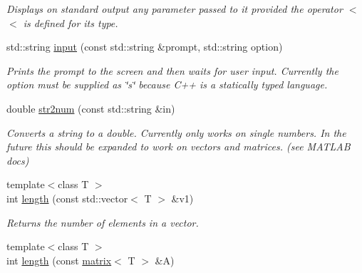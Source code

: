\begin{DoxyCompactItemize}
\begin{DoxyCompactList}\small\item\em Displays on standard output any parameter passed to it provided the operator $<$$<$ is defined for its type. \end{DoxyCompactList}\item 
\hypertarget{namespacekeycpp_aba69db64fe38ad271de1939d3f1a5520}{std\-::string \hyperlink{namespacekeycpp_aba69db64fe38ad271de1939d3f1a5520}{input} (const std\-::string \&prompt, std\-::string option)}\label{namespacekeycpp_aba69db64fe38ad271de1939d3f1a5520}

\begin{DoxyCompactList}\small\item\em Prints the prompt to the screen and then waits for user input. Currently the option must be supplied as \char`\"{}s\char`\"{} because C++ is a statically typed language. \end{DoxyCompactList}\item 
\hypertarget{namespacekeycpp_a4bca7924aad17a920f2f5f0606e6d9a9}{double \hyperlink{namespacekeycpp_a4bca7924aad17a920f2f5f0606e6d9a9}{str2num} (const std\-::string \&in)}\label{namespacekeycpp_a4bca7924aad17a920f2f5f0606e6d9a9}

\begin{DoxyCompactList}\small\item\em Converts a string to a double. Currently only works on single numbers. In the future this should be expanded to work on vectors and matrices. (see M\-A\-T\-L\-A\-B docs) \end{DoxyCompactList}\item 
\hypertarget{namespacekeycpp_a1c5fcab6592307cffe0e9aa035122a2e}{{\footnotesize template$<$class T $>$ }\\int \hyperlink{namespacekeycpp_a1c5fcab6592307cffe0e9aa035122a2e}{length} (const std\-::vector$<$ T $>$ \&v1)}\label{namespacekeycpp_a1c5fcab6592307cffe0e9aa035122a2e}

\begin{DoxyCompactList}\small\item\em Returns the number of elements in a vector. \end{DoxyCompactList}\item 
\hypertarget{namespacekeycpp_a856e64b0828ca7b61e301e8a803cfa91}{{\footnotesize template$<$class T $>$ }\\int \hyperlink{namespacekeycpp_a856e64b0828ca7b61e301e8a803cfa91}{length} (const \hyperlink{classkeycpp_1_1matrix}{matrix}$<$ T $>$ \&A)}\label{namespacekeycpp_a856e64b0828ca7b61e301e8a803cfa91}


\end{DoxyCompactItemize}
